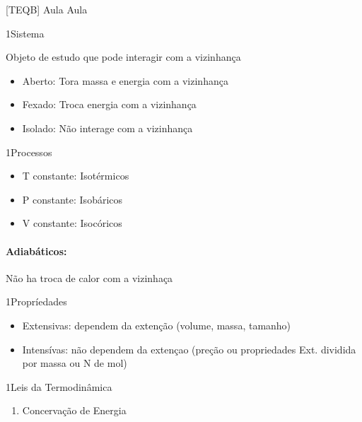 \documentclass[\mainfilename]{subfiles}
\begin{document}
[TEQB]
{Aula}
{Aula}

\begin{definitionBox}1{Sistema}
    
    Objeto de estudo que pode interagir com a vizinhança

    \begin{itemize}
        \item Aberto: Tora massa e energia com a vizinhança
        \item Fexado: Troca energia com a vizinhança
        \item Isolado: Não interage com a vizinhança
    \end{itemize}
    
\end{definitionBox}

\begin{sectionBox}1{Processos}
    
    \begin{itemize}
        \item T constante: Isotérmicos
        \item P constante: Isobáricos
        \item V constante: Isocóricos
    \end{itemize}

    \paragraph{Adiabáticos:} Não ha troca de calor com a vizinhaça
    
\end{sectionBox}

\begin{sectionBox}1{Propríedades}
    
    \begin{itemize}
        \item Extensivas: dependem da extenção (volume, massa, tamanho)
        \item Intensívas: não dependem da extençao (preção ou propriedades Ext. dividida por massa ou N de mol)
    \end{itemize}
    
\end{sectionBox}

\begin{sectionBox}1{Leis da Termodinâmica}
    
    \begin{enumerate}
        \item Concervação de Energia
    \end{enumerate}
    
\end{sectionBox}
\end{document}
